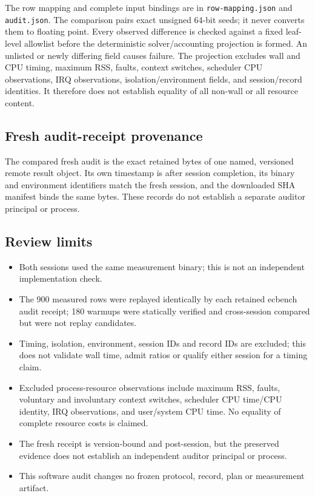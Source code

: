 \documentclass[10pt]{article}
\begin{document}
The row mapping and complete input bindings are in \texttt{row-mapping.json} and \texttt{audit.json}. The comparison pairs exact unsigned 64-bit seeds; it never converts them to floating point. Every observed difference is checked against a fixed leaf-level allowlist before the deterministic solver/accounting projection is formed. An unlisted or newly differing field causes failure. The projection excludes wall and CPU timing, maximum RSS, faults, context switches, scheduler CPU observations, IRQ observations, isolation/environment fields, and session/record identities. It therefore does not establish equality of all non-wall or all resource content.

\subsection*{Fresh audit-receipt provenance}
The compared fresh audit is the exact retained bytes of one named, versioned remote result object. Its own timestamp is after session completion, its binary and environment identifiers match the fresh session, and the downloaded SHA manifest binds the same bytes. These records do not establish a separate auditor principal or process.

\subsection*{Review limits}
\begin{itemize}
\item Both sessions used the same measurement binary; this is not an independent implementation check.
\item The 900 measured rows were replayed identically by each retained ecbench audit receipt; 180 warmups were statically verified and cross-session compared but were not replay candidates.
\item Timing, isolation, environment, session IDs and record IDs are excluded; this does not validate wall time, admit ratios or qualify either session for a timing claim.
\item Excluded process-resource observations include maximum RSS, faults, voluntary and involuntary context switches, scheduler CPU time/CPU identity, IRQ observations, and user/system CPU time. No equality of complete resource costs is claimed.
\item The fresh receipt is version-bound and post-session, but the preserved evidence does not establish an independent auditor principal or process.
\item This software audit changes no frozen protocol, record, plan or measurement artifact.
\end{itemize}
\end{document}
